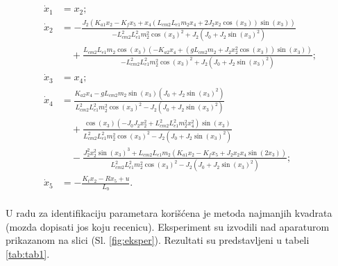 \documentclass[a4paper,11pt]{article}
\theoremstyle{definition} \newtheorem{deff}{Definicija}[section]
\theoremstyle{definition} \newtheorem{prim}[deff]{Primer}
\theoremstyle{plain} \newtheorem{teor}[deff]{Teorema}
\begin{document}
	\begin{equation}
		\begin{aligned}
			\dot{x}_1 &= x_2; \\[0.8em]
			\dot{x}_2 &= -\frac{J_2(K_{a1}x_2 - K_fx_5 + x_4(L_{cm2}L_{e1}m_2x_4 + 2J_2x_2\cos(x_3))\sin(x_3))}{-L_{cm2}^2L_{e1}^2m_2^2\cos(x_3)^2 + J_2(J_0 + J_2\sin(x_3)^2)} \\[0.8em]
			&\quad + \frac{L_{cm2}L_{e1}m_2\cos(x_3)(-K_{a2}x_4 + (gL_{cm2}m_2 + J_2x_2^2\cos(x_3))\sin(x_3))}{-L_{cm2}^2L_{e1}^2m_2^2\cos(x_3)^2 + J_2(J_0 + J_2\sin(x_3)^2)}; \\[0.8em]
			\dot{x}_3 &= x_4; \\[0.5em]
			\dot{x}_4 &= \frac{K_{a2}x_4 - gL_{cm2}m_2\sin(x_3)(J_0 + J_2\sin(x_3)^2)}{L_{cm2}^2L_{e1}^2m_2^2\cos(x_3)^2 - J_2(J_0 + J_2\sin(x_3)^2)} \\[0.8em]
			&\quad + \frac{\cos(x_3)(-J_0J_2x_2^2 + L_{cm2}^2L_{e1}^2m_2^2x_4^2)\sin(x_3)}{L_{cm2}^2L_{e1}^2m_2^2\cos(x_3)^2 - J_2(J_0 + J_2\sin(x_3)^2)} \\[0.8em]
			&\quad - \frac{J_2^2x_2^2\sin(x_3)^3 + L_{cm2}L_{e1}m_2(K_{a1}x_2 - K_fx_5 + J_2x_2x_4\sin(2x_3))}{L_{cm2}^2L_{e1}^2m_2^2\cos(x_3)^2 - J_2(J_0 + J_2\sin(x_3)^2)};\\[0.5em]
			\dot{x}_5 &= -\frac{K_tx_2 - Rx_5 + u}{L_b}.
		\end{aligned}
		\label{eq:nonModel}
	\end{equation}\\
	
	U radu \cite{inicijalna} za identifikaciju parametara korišćena je metoda najmanjih kvadrata (mozda dopisati jos koju recenicu). Eksperiment su izvodili nad aparaturom prikazanom na slici (Sl. \ref{fig:eksper}). Rezultati su predstavljeni u tabeli \ref{tab:tab1}.
	
\end{document}
